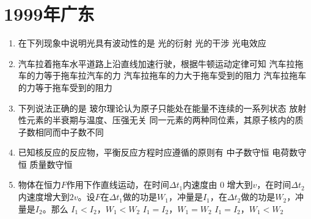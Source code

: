 \documentclass[\gkver]{gaokaozhenti}
\begin{document}
\chapter{1999年广东}

\begin{enumerate}
\item
在下列现象中说明光具有波动性的是
{光的衍射}
{光的干涉}
{光电效应}

\item
汽车拉着拖车水平道路上沿直线加速行驶，根据牛顿运动定律可知
{汽车拉拖车的力等于拖车拉汽车的力}
{汽车拉拖车的力大于拖车受到的阻力}
{汽车拉拖车的力等于拖车受到的阻力}

\item
下列说法正确的是
{玻尔理论认为原子只能处在能量不连续的一系列状态}
{放射性元素的半衰期与温度、压强无关}
{同一元素的两种同位素，其原子核内的质子数相同而中子数不同}

\item
已知核反应的反应物，平衡反应方程时应遵循的原则有
{中子数守恒}
{电荷数守恒}
{质量数守恒}

\item
物体在恒力$F$作用下作直线运动，在时间$\Delta t_{1}$内速度由 0 增大到$v$，在时间$\Delta t_{2}$内速度增大到$2v$。设$F$在$\Delta t_{1}$做的功是$W_{1}$，冲量是$I_{1}$，在$\Delta t_{2}$做的功是$W_{2}$，冲量是$I_{2}$。那么
{$I_{1}<I_{2}$，$W_{1}<W_{2}$}
{$I_{1}=I_{2}$，$W_{1}=W_{2}$}
{$I_{1}=I_{2}$，$W_{1}<W_{2}$}


\end{enumerate}
\end{document}
